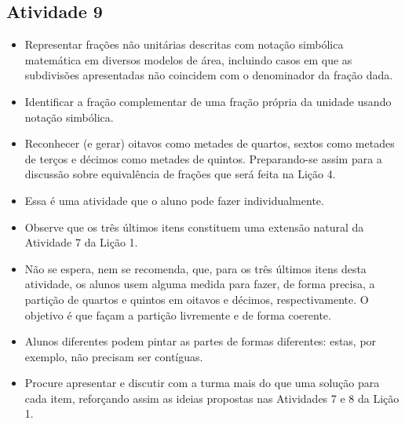 \subsection{Atividade 9}

   \vspace{.1cm}

  \begin{itemize} %
    \item       Representar frações não unitárias descritas com notação simbólica matemática em diversos modelos de área, incluindo casos em que as subdivisões apresentadas não coincidem com o denominador da fração dada.
    \item       Identificar a fração complementar de uma fração própria da unidade usando notação simbólica.
    \item       Reconhecer (e gerar) oitavos como metades de quartos, sextos como metades de terços e décimos como metades de quintos. Preparando-se assim para a discussão sobre equivalência de frações que será feita na Lição 4.
\end{itemize} %


  \vspace{.1cm}

  \vspace{.1cm}

\begin{itemize} %
    \item       Essa é uma atividade que o aluno pode fazer individualmente.
    \item       Observe que os três últimos itens constituem uma extensão natural da Atividade 7 da Lição 1.
    \item       Não se espera, nem se recomenda, que, para os três últimos itens desta atividade, os alunos usem alguma medida para fazer, de forma precisa, a partição de quartos e quintos em oitavos e décimos, respectivamente. O objetivo é que façam a partição livremente e de forma coerente.
    \item       Alunos diferentes podem pintar as partes de formas diferentes: estas, por exemplo, não precisam ser contíguas.
    \item       Procure apresentar e discutir com a turma mais do que uma solução para cada item, reforçando assim as ideias propostas nas Atividades 7 e 8 da Lição 1.
\end{itemize} %


